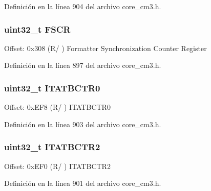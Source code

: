 Definición en la línea 904 del archivo core\+\_\+cm3.\+h.

\subsubsection[{\texorpdfstring{F\+S\+CR}{FSCR}}]{ uint32\+\_\+t F\+S\+CR}\hypertarget{struct_t_p_i___type_a3030960fcac362026459469bc2ff3178}{}\label{struct_t_p_i___type_a3030960fcac362026459469bc2ff3178}
Offset\+: 0x308 (R/ ) Formatter Synchronization Counter Register 

Definición en la línea 897 del archivo core\+\_\+cm3.\+h.

\subsubsection[{\texorpdfstring{I\+T\+A\+T\+B\+C\+T\+R0}{ITATBCTR0}}]{ uint32\+\_\+t I\+T\+A\+T\+B\+C\+T\+R0}\hypertarget{struct_t_p_i___type_afa3718bbb523ffb294402f58896592e6}{}\label{struct_t_p_i___type_afa3718bbb523ffb294402f58896592e6}
Offset\+: 0x\+E\+F8 (R/ ) I\+T\+A\+T\+B\+C\+T\+R0 

Definición en la línea 903 del archivo core\+\_\+cm3.\+h.

\subsubsection[{\texorpdfstring{I\+T\+A\+T\+B\+C\+T\+R2}{ITATBCTR2}}]{ uint32\+\_\+t I\+T\+A\+T\+B\+C\+T\+R2}\hypertarget{struct_t_p_i___type_a89c5da21240d76e6b873144202deffa3}{}\label{struct_t_p_i___type_a89c5da21240d76e6b873144202deffa3}
Offset\+: 0x\+E\+F0 (R/ ) I\+T\+A\+T\+B\+C\+T\+R2 

Definición en la línea 901 del archivo core\+\_\+cm3.\+h.

